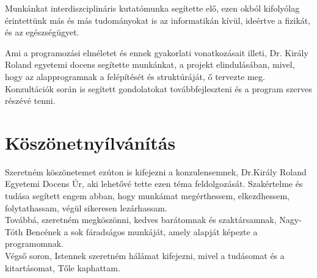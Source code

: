 \documentclass[tocnopagenum]{thesis-ekf}
\theoremstyle{definition}
\theoremstyle{remark}
\begin{document}
	Munkánkat interdiszciplináris kutatómunka segítette elő, ezen okból kifolyólag érintettünk más és más tudományokat is az informatikán kívül, ideértve a fizikát, és az egészségügyet.
	
	Ami a programozási elméletet és ennek gyakorlati vonatkozásait illeti, Dr. Király Roland  egyetemi docens segítette munkánkat, a projekt elindulásában, mivel, hogy az alapprogramnak a felépítését és struktúráját, ő tervezte meg. Konzultációk során is segített gondolatokat továbbfejleszteni és a program szerves részévé tenni.

	\chapter*{Köszönetnyílvánítás}
	Szeretném köszönetemet ezúton is kifejezni a konzulensemnek, Dr.Király Roland Egyetemi Docens Úr, aki lehetővé tette ezen téma feldolgozását.
	Szakértelme és tudása segített engem abban, hogy munkámat megérthessem, elkezdhessem, folytathassam, végül sikeresen lezárhassam.
	\\
	Továbbá, szeretném megköszönni, kedves barátomnak és szaktársamnak, Nagy-Tóth Bencének a sok fáradságos munkáját, amely alapját képezte a programomnak. 
	\\
	Végső soron, Istennek szeretném hálámat kifejezni, mivel a tudásomat és a kitartásomat, Tőle kaphattam. 
	


	
	

	\listoffigures
\end{document}
